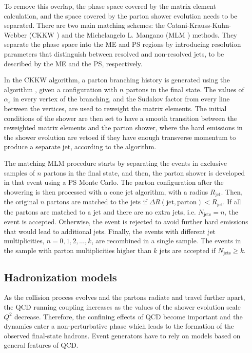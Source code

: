 To remove this overlap, the phase space covered by the matrix element calculation, and the space covered by the parton shower evolution needs to be separated.
There are two main matching schemes: the Catani-Krauss-Kuhn-Webber (CKKW \cite{Catani:2001cc}) and the Michelangelo L. Mangano (MLM \cite{Mangano:2006rw}) methods.
They separate the phase space into the ME and PS regions by introducing resolution parameters that distinguish between resolved and non-resolved jets, to be described by the ME and the PS, respectively.

In the CKKW algorithm, a parton branching history is generated using the \kt{} algorithm \cite{Catani:1991hj}, given a configuration with $n$ partons in the final state.
The values of $\alpha_s$ in every vertex of the branching, and the Sudakov factor from every line between the vertices, are used to reweight the matrix elements.
The initial conditions of the shower are then set to have a smooth transition between the reweighted matrix elements and the parton shower, where the hard emissions in the shower evolution are vetoed if they have enough transverse momentum to produce a separate jet, according to the \kt{} algorithm.

The matching MLM procedure starts by separating the events in exclusive samples of $n$ partons in the final state, and then, the parton shower is developed in that event using a PS Monte Carlo.
The parton configuration after the showering is then processed with a cone jet algorithm, with a radius $R_{\text{jet}}$.
Then, the original $n$ partons are matched to the jets if $\Delta R(\text{jet}, \text{parton}) < R_{\text{jet}}$.
If all the partons are matched to a jet and there are no extra jets, i.e. $N_{\text{jets}}=n$, the event is accepted.
Otherwise, the event is rejected to avoid further hard emissions that would lead to additional jets.
Finally, the events with different jet multiplicities, $n=0, 1, 2, \ldots, k$, are recombined in a single sample.
The events in the sample with parton multiplicities higher than $k$ jets are accepted if $N_\text{jets}\geq k$.


\subsection{Hadronization models}
    \label{subsec:HadronizationModels}

As the collision process evolves and the partons radiate and travel further apart, the QCD running coupling increases as the values of the shower evolution scale $Q^2$ decrease.
Therefore, the confining effects of QCD become important and the dynamics enter a non-perturbative phase which leads to the formation of the observed final-state hadrons.
Event generators have to rely on models based on general features of QCD.


